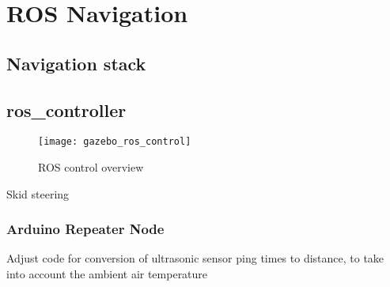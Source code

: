 \chapter{ROS Navigation}

\section{Navigation stack}

\section{ros\_controller}
\begin{figure}[h]
	\caption{ROS control overview}
	\texttt{[image: gazebo\_ros\_control]}
	\label{fig:ros_controller}
\end{figure}

Skid steering

\subsection{Arduino Repeater Node}
Adjust code for conversion of ultrasonic sensor ping times to distance, to take into account the ambient air temperature